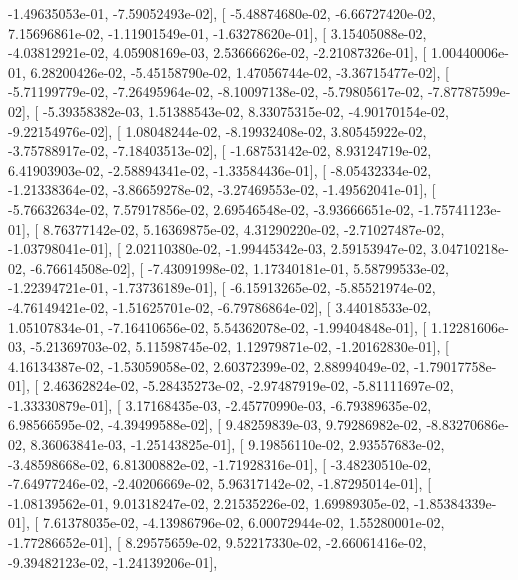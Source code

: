 \documentclass{article}
\begin{document}
         -1.49635053e-01,  -7.59052493e-02],
       [ -5.48874680e-02,  -6.66727420e-02,   7.15696861e-02,
         -1.11901549e-01,  -1.63278620e-01],
       [  3.15405088e-02,  -4.03812921e-02,   4.05908169e-03,
          2.53666626e-02,  -2.21087326e-01],
       [  1.00440006e-01,   6.28200426e-02,  -5.45158790e-02,
          1.47056744e-02,  -3.36715477e-02],
       [ -5.71199779e-02,  -7.26495964e-02,  -8.10097138e-02,
         -5.79805617e-02,  -7.87787599e-02],
       [ -5.39358382e-03,   1.51388543e-02,   8.33075315e-02,
         -4.90170154e-02,  -9.22154976e-02],
       [  1.08048244e-02,  -8.19932408e-02,   3.80545922e-02,
         -3.75788917e-02,  -7.18403513e-02],
       [ -1.68753142e-02,   8.93124719e-02,   6.41903903e-02,
         -2.58894341e-02,  -1.33584436e-01],
       [ -8.05432334e-02,  -1.21338364e-02,  -3.86659278e-02,
         -3.27469553e-02,  -1.49562041e-01],
       [ -5.76632634e-02,   7.57917856e-02,   2.69546548e-02,
         -3.93666651e-02,  -1.75741123e-01],
       [  8.76377142e-02,   5.16369875e-02,   4.31290220e-02,
         -2.71027487e-02,  -1.03798041e-01],
       [  2.02110380e-02,  -1.99445342e-03,   2.59153947e-02,
          3.04710218e-02,  -6.76614508e-02],
       [ -7.43091998e-02,   1.17340181e-01,   5.58799533e-02,
         -1.22394721e-01,  -1.73736189e-01],
       [ -6.15913265e-02,  -5.85521974e-02,  -4.76149421e-02,
         -1.51625701e-02,  -6.79786864e-02],
       [  3.44018533e-02,   1.05107834e-01,  -7.16410656e-02,
          5.54362078e-02,  -1.99404848e-01],
       [  1.12281606e-03,  -5.21369703e-02,   5.11598745e-02,
          1.12979871e-02,  -1.20162830e-01],
       [  4.16134387e-02,  -1.53059058e-02,   2.60372399e-02,
          2.88994049e-02,  -1.79017758e-01],
       [  2.46362824e-02,  -5.28435273e-02,  -2.97487919e-02,
         -5.81111697e-02,  -1.33330879e-01],
       [  3.17168435e-03,  -2.45770990e-03,  -6.79389635e-02,
          6.98566595e-02,  -4.39499588e-02],
       [  9.48259839e-03,   9.79286982e-02,  -8.83270686e-02,
          8.36063841e-03,  -1.25143825e-01],
       [  9.19856110e-02,   2.93557683e-02,  -3.48598668e-02,
          6.81300882e-02,  -1.71928316e-01],
       [ -3.48230510e-02,  -7.64977246e-02,  -2.40206669e-02,
          5.96317142e-02,  -1.87295014e-01],
       [ -1.08139562e-01,   9.01318247e-02,   2.21535226e-02,
          1.69989305e-02,  -1.85384339e-01],
       [  7.61378035e-02,  -4.13986796e-02,   6.00072944e-02,
          1.55280001e-02,  -1.77286652e-01],
       [  8.29575659e-02,   9.52217330e-02,  -2.66061416e-02,
         -9.39482123e-02,  -1.24139206e-01],
\end{document}

